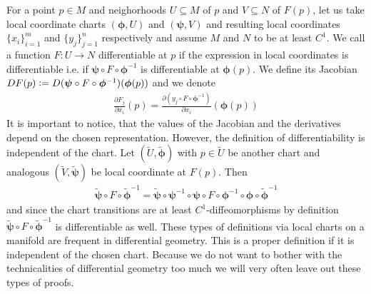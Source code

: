 \documentclass[../master_thesis.tex]{subfiles}
\begin{document}
For a point $p \in M$ and neighorhoods $U \subseteq M$ of $p$ and 
$V \subseteq N$ of $F(p)$, let us take local coordinate charts 
$(\boldsymbol{\phi}, U)$ and $(\boldsymbol{\psi}, V)$  and resulting local coordinates 
$\{x_i\}_{i=1}^m$ and $\{ y_j\}_{j=1}^n$ respectively and assume 
$M$ and $N$ to be at least $C^1$. We call a function 
$F: U \rightarrow N$ differentiable at $p$ if the expression in local coordinates
is differentiable i.e. if 
$\boldsymbol{\psi} \circ F \circ \boldsymbol{\phi}^{-1}$ is differentiable
at $\boldsymbol{\phi}(p)$.
We define its Jacobian $DF(p) \vcentcolon= D(\boldsymbol{\psi} \circ F \circ 
\boldsymbol{\phi}^{-1})(\boldsymbol{\phi}(p))$ 
and we denote 
\begin{align}
    \frac{\partial F_j}{\partial x_i}(p) 
    = \frac{\partial (y_j \circ F \circ \boldsymbol{\phi}^{-1})}{\partial x_i} (\boldsymbol{\phi}(p))
    \label{eq:derivative_on_manifold} 
\end{align}
It is important to notice, that the values of the Jacobian 
and the derivatives depend on the chosen representation.
However, the definition of differentiability is independent of the chart. 
Let $(\tilde{U},\boldsymbol{\tilde{\phi}})$ with $p \in \tilde{U}$ be 
another chart and analogous $(\tilde{V},\boldsymbol{\tilde{\psi}})$ be local coordinate 
at $F(p)$.
Then 
\begin{align*}
    \boldsymbol{\tilde{\psi}} \circ F \circ \boldsymbol{\tilde{\phi}}^{-1} 
    = \boldsymbol{\tilde{\psi}} \circ \bm{\psi}^{-1} \circ \bm{\psi} \circ F \circ \bm{\phi}^{-1} 
        \circ \bm{\phi} \circ \boldsymbol{\tilde{\phi}}^{-1}
\end{align*}
and since the chart transitions are at least $C^1$-diffeomorphisms by definition
$\boldsymbol{\tilde{\psi}} \circ F \circ \boldsymbol{\tilde{\phi}}^{-1} $ is differentiable as well.
These types of definitions via local charts on a manifold are frequent in
differential geometry. This is a proper definition if it is independent of the 
chosen chart. Because we do not want to bother with the technicalities of 
differential geometry too much we will very often leave out these types of
proofs. 
\end{document}
